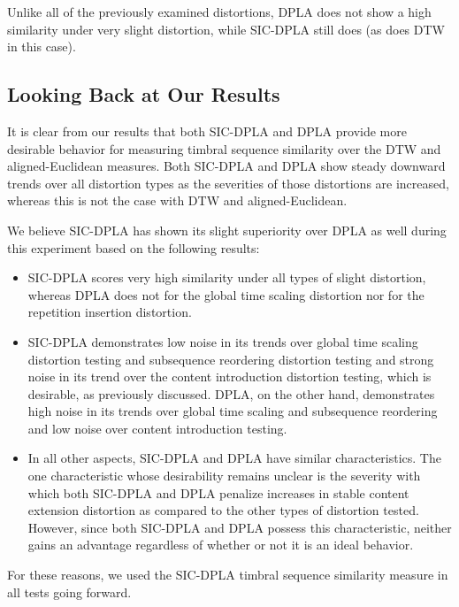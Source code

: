 \documentclass[12pt]{report} 	%
\numberwithin{figure}{chapter}
\numberwithin{table}{chapter}
\numberwithin{equation}{chapter}
\begin{document}
\begin{flushleft}
Unlike all of the previously examined distortions, DPLA does not show a high similarity under very slight distortion, while SIC-DPLA still does (as does DTW in this case).

\vspace{12pt}
\subsection{Looking Back at Our Results}

It is clear from our results that both SIC-DPLA and DPLA provide more desirable behavior for measuring timbral sequence similarity over the DTW and aligned-Euclidean measures. Both SIC-DPLA and DPLA show steady downward trends over all distortion types as the severities of those distortions are increased, whereas this is not the case with DTW and aligned-Euclidean.

We believe SIC-DPLA has shown its slight superiority over DPLA as well during this experiment based on the following results:
\begin{itemize}
\item SIC-DPLA scores very high similarity under all types of slight distortion, whereas DPLA does not for the global time scaling distortion nor for the repetition insertion distortion. 
\item SIC-DPLA demonstrates low noise in its trends over global time scaling distortion testing and subsequence reordering distortion testing and strong noise in its trend over the content introduction distortion testing, which is desirable, as previously discussed. DPLA, on the other hand, demonstrates high noise in its trends over global time scaling and subsequence reordering and low noise over content introduction testing.
\item In all other aspects, SIC-DPLA and DPLA have similar characteristics. The one characteristic whose desirability remains unclear is the severity with which both SIC-DPLA and DPLA penalize increases in stable content extension distortion as compared to the other types of distortion tested. However, since both SIC-DPLA and DPLA possess this characteristic, neither gains an advantage regardless of whether or not it is an ideal behavior.
\end{itemize}

For these reasons, we used the SIC-DPLA timbral sequence similarity measure in all tests going forward.


\end{flushleft}
\end{document}
